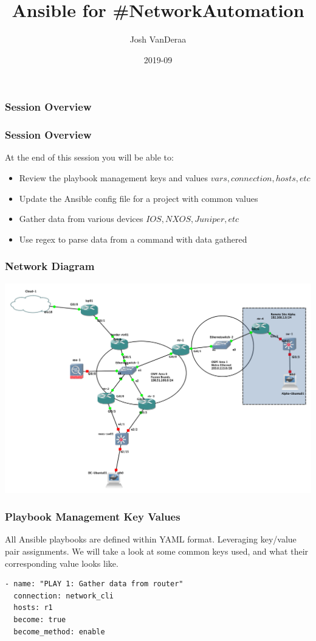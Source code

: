 \documentclass{beamer}
\title{Ansible for \#NetworkAutomation}
\author{Josh VanDeraa}
\date{2019-09}
\begin{document}
\frame{\titlepage}

\begin{frame}
    \frametitle{Session Overview}
    \tableofcontents
\end{frame}

\begin{frame}
\frametitle{Session Overview}
At the end of this session you will be able to:
\begin{itemize}
  \item <2-> Review the playbook management keys and values \(vars, connection, hosts, etc\)
  \item <3-> Update the Ansible config file for a project with common values
  \item <4-> Gather data from various devices \(IOS, NXOS, Juniper, etc\)
  \item <5-> Use regex to parse data from a command with data gathered
\end{itemize}
\end{frame}

\begin{frame}
\frametitle{Network Diagram}
\includegraphics[width=\textwidth]{assets/base_setup.png}
\end{frame}



\begin{frame}[fragile]
    \frametitle{Playbook Management Key Values}
    All Ansible playbooks are defined within YAML format. Leveraging key/value
    pair assignments. We will take a look at some common keys used, and what their
    corresponding value looks like.
\begin{verbatim}
- name: "PLAY 1: Gather data from router"
  connection: network_cli
  hosts: r1
  become: true
  become_method: enable
\end{verbatim}
\end{frame}
\end{document}
